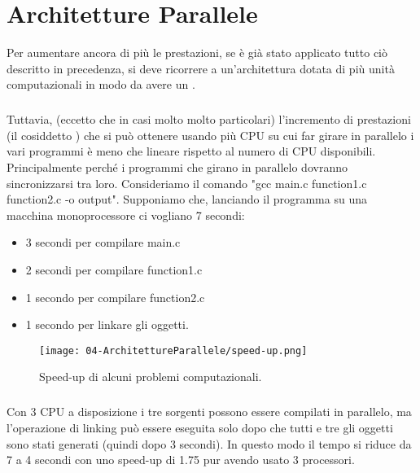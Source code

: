 \chapter{Architetture Parallele}

Per aumentare ancora di più le prestazioni, se è già stato applicato tutto ciò descritto in precedenza, si deve ricorrere a un'architettura dotata di più unità computazionali in modo da avere un . 


\paragraph{}

Tuttavia, (eccetto che in casi molto molto particolari) l’incremento di
prestazioni (il cosiddetto ) che si può ottenere usando più
CPU su cui far girare in parallelo i vari programmi è meno che
lineare rispetto al numero di CPU disponibili. Principalmente perché i programmi che girano in parallelo dovranno sincronizzarsi tra loro. Consideriamo il comando "gcc main.c function1.c function2.c -o output". Supponiamo che, lanciando il programma su una macchina monoprocessore ci vogliano 7 secondi: 

\begin{itemize}
  \item 3 secondi per compilare main.c 
  \item 2 secondi per compilare function1.c 
  \item 1 secondo per compilare function2.c 
  \item 1 secondo per linkare gli oggetti. 
\end{itemize}

\begin{wrapfigure}{r}{0.35\textwidth} %
    \centering
    \texttt{[image: 04-ArchitettureParallele/speed-up.png]}
    \caption{Speed-up di alcuni problemi computazionali.}
\end{wrapfigure}
\paragraph{}
Con 3 CPU a disposizione i tre sorgenti possono essere compilati in parallelo, ma l'operazione di linking può essere eseguita solo dopo che tutti e tre gli oggetti sono stati generati (quindi dopo 3 secondi). In questo modo il tempo si riduce da 7 a 4 secondi con uno speed-up di 1.75 pur avendo usato 3 processori.








